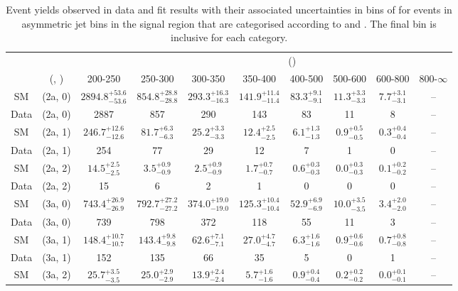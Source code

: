 \begin{table}[h!]
\tiny
\centering
\caption{Event yields observed in data and fit results with their associated uncertainties in bins of \scalht for events in asymmetric jet bins in the signal region that are categorised according to \njet and \nb.
The final \scalht bin is inclusive for each category. \label{tab:yieldsewkdatapost_sig_comb_asym}}
\begin{tabular}
{cccccccccc}
	\hline\hline
&	&	& \multicolumn{8}{c}{\scalht (\gev)}\\ 
	&	 (\njet, \nb) & 200-250 & 250-300 & 300-350 & 350-400 & 400-500 & 500-600 & 600-800 & 800-$\infty$ \\ [0.8ex] 
\hline
	SM & (2a, 0) & $2894.8^{+ 53.6 }_{- 53.6 }$ & $854.8^{+ 28.8 }_{- 28.8 }$ & $293.3^{+ 16.3 }_{- 16.3 }$ & $141.9^{+ 11.4 }_{- 11.4 }$ & $83.3^{+ 9.1 }_{- 9.1 }$ & $11.3^{+ 3.3 }_{- 3.3 }$ & $7.7^{+ 3.1 }_{- 3.1 }$ & -- \\[0.5ex] 
	Data & (2a, 0) & 2887 & 857 & 290 & 143 & 83 & 11 & 8 & -- \\[0.5ex] 
	SM & (2a, 1) & $246.7^{+ 12.6 }_{- 12.6 }$ & $81.7^{+ 6.3 }_{- 6.3 }$ & $25.2^{+ 3.3 }_{- 3.3 }$ & $12.4^{+ 2.5 }_{- 2.5 }$ & $6.1^{+ 1.3 }_{- 1.3 }$ & $0.9^{+ 0.5 }_{- 0.5 }$ & $0.3^{+ 0.4 }_{- 0.4 }$ & -- \\[0.5ex] 
	Data & (2a, 1) & 254 & 77 & 29 & 12 & 7 & 1 & 0 & -- \\[0.5ex] 
	SM & (2a, 2) & $14.5^{+ 2.5 }_{- 2.5 }$ & $3.5^{+ 0.9 }_{- 0.9 }$ & $2.5^{+ 0.9 }_{- 0.9 }$ & $1.7^{+ 0.7 }_{- 0.7 }$ & $0.6^{+ 0.3 }_{- 0.3 }$ & $0.0^{+ 0.3 }_{- 0.3 }$ & $0.1^{+ 0.2 }_{- 0.2 }$ & -- \\[0.5ex] 
	Data & (2a, 2) & 15 & 6 & 2 & 1 & 0 & 0 & 0 & -- \\[0.5ex] 
	SM & (3a, 0) & $743.4^{+ 26.9 }_{- 26.9 }$ & $792.7^{+ 27.2 }_{- 27.2 }$ & $374.0^{+ 19.0 }_{- 19.0 }$ & $125.3^{+ 10.4 }_{- 10.4 }$ & $52.9^{+ 6.9 }_{- 6.9 }$ & $10.0^{+ 3.5 }_{- 3.5 }$ & $3.4^{+ 2.0 }_{- 2.0 }$ & -- \\[0.5ex] 
	Data & (3a, 0) & 739 & 798 & 372 & 118 & 55 & 11 & 3 & -- \\[0.5ex] 
	SM & (3a, 1) & $148.4^{+ 10.7 }_{- 10.7 }$ & $143.4^{+ 9.8 }_{- 9.8 }$ & $62.6^{+ 7.1 }_{- 7.1 }$ & $27.0^{+ 4.7 }_{- 4.7 }$ & $6.3^{+ 1.6 }_{- 1.6 }$ & $0.9^{+ 0.6 }_{- 0.6 }$ & $0.7^{+ 0.8 }_{- 0.8 }$ & -- \\[0.5ex] 
	Data & (3a, 1) & 152 & 135 & 66 & 35 & 5 & 0 & 1 & -- \\[0.5ex] 
	SM & (3a, 2) & $25.7^{+ 3.5 }_{- 3.5 }$ & $25.0^{+ 2.9 }_{- 2.9 }$ & $13.9^{+ 2.4 }_{- 2.4 }$ & $5.7^{+ 1.6 }_{- 1.6 }$ & $0.9^{+ 0.4 }_{- 0.4 }$ & $0.2^{+ 0.2 }_{- 0.2 }$ & $0.0^{+ 0.1 }_{- 0.1 }$ & -- \\[0.5ex] 

\end{tabular}
\end{table}
